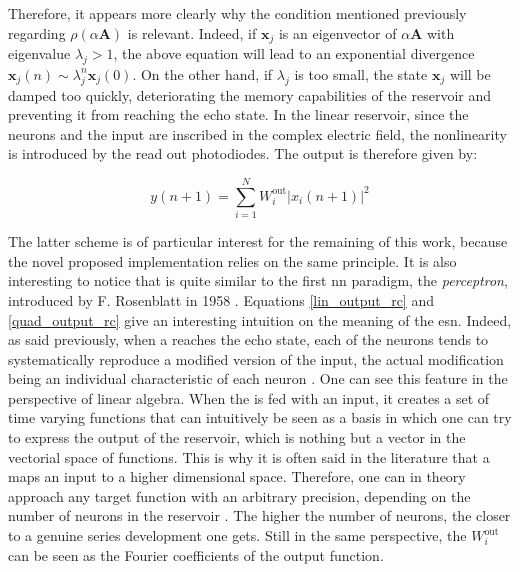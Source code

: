 Therefore, it appears more clearly why the condition mentioned previously regarding $\rho \left( \alpha \mathbf{A} \right)$ is relevant. Indeed, if $\mathbf{x}_j$ is an eigenvector of $\alpha \mathbf{A}$ with eigenvalue $\lambda_j>1$, the above equation will lead to an exponential divergence $\mathbf{x}_j(n) \sim \lambda_j^n \mathbf{x}_j(0)$. On the other hand, if $\lambda_j$ is too small, the state $\mathbf{x}_j$ will be damped too quickly, deteriorating the memory capabilities of the reservoir and preventing it from reaching the echo state. In the linear reservoir, since the neurons and the input are inscribed in the complex electric field, the nonlinearity is introduced by the read out photodiodes. The output is therefore given by:

\begin{equation}
	y(n+1) = \sum_{i=1}^{N} W^{\text{out}}_i |x_i (n+1)|^2
	\label{quad_output_rc}
\end{equation}

The latter scheme is of particular interest for the remaining of this work, because the novel proposed implementation relies on the same principle. It is also interesting to notice that is quite similar to the first \gls{nn} paradigm, the \emph{perceptron}, introduced by F. Rosenblatt in 1958 \cite{Rosenblatt58theperceptron}. Equations \eqref{lin_output_rc} and \eqref{quad_output_rc} give an interesting intuition on the meaning of the \gls{esn}. Indeed, as said previously, when a \rc reaches the echo state, each of the neurons tends to systematically reproduce a modified version of the input, the actual modification being an individual characteristic of each neuron \cite{Jaeger2004}. One can see this feature in the perspective of linear algebra. When the \rcer is fed with an input, it creates a set of time varying functions that can intuitively be seen as a basis in which one can try to express the output of the reservoir, which is nothing but a vector in the vectorial space of functions. This is why it is often said in the literature that a \rcer maps an input to a higher dimensional space. Therefore, one can in theory approach any target function with an arbitrary precision, depending on the number of neurons in the reservoir \cite{Jaeger2004}. The higher the number of neurons, the closer to a genuine series development one gets. Still in the same perspective, the $W^{\text{out}}_i$ can be seen as the Fourier coefficients of the output function.\\


